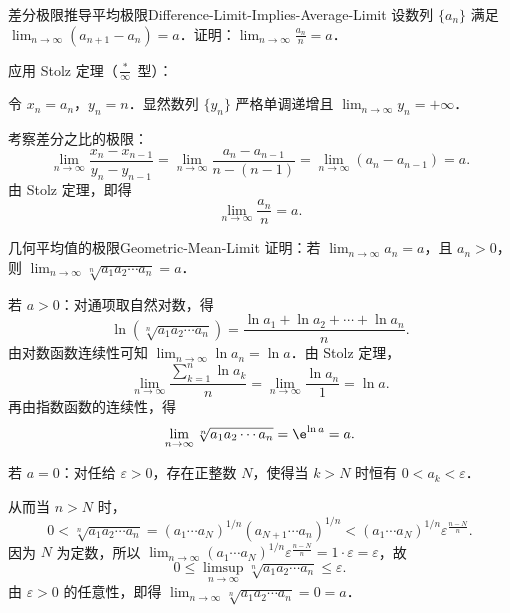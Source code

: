 \begin{problem}{差分极限推导平均极限}{Difference-Limit-Implies-Average-Limit}
    设数列 $\{a_n\}$ 满足 $\lim_{n\to\infty} (a_{n+1} - a_n) = a$．证明：$\lim_{n\to\infty} \frac{a_n}{n} = a$．
\end{problem}

\begin{myproof}
    应用 Stolz 定理（$\frac{*}{\infty}$ 型）：

    令 $x_n = a_n$，$y_n = n$．显然数列 $\{y_n\}$ 严格单调递增且 $\lim_{n\to\infty} y_n = +\infty$．

    考察差分之比的极限：
    \begin{equation}
        \lim_{n\to\infty} \frac{x_n - x_{n-1}}{y_n - y_{n-1}} = \lim_{n\to\infty} \frac{a_n - a_{n-1}}{n - (n-1)} = \lim_{n\to\infty} (a_n - a_{n-1}) = a.
    \end{equation}
    由 Stolz 定理，即得
    \begin{equation}
        \lim_{n\to\infty} \frac{a_n}{n} = a.
    \end{equation}
\end{myproof}

\begin{problem}{几何平均值的极限}{Geometric-Mean-Limit}
    证明：若 $\lim_{n\to\infty} a_n = a$，且 $a_n > 0$，则 $\lim_{n\to\infty} \sqrt[n]{a_1 a_2 \cdots a_n} = a$．
\end{problem}

\begin{myproof}
    若 $a > 0$：对通项取自然对数，得
    \begin{equation}
        \ln \left( \sqrt[n]{a_1 a_2 \cdots a_n} \right) = \frac{\ln a_1 + \ln a_2 + \cdots + \ln a_n}{n}.
    \end{equation}
    由对数函数连续性可知 $\lim_{n\to\infty} \ln a_n = \ln a$．由 Stolz 定理，
    \begin{equation}
        \lim_{n\to\infty} \frac{\sum_{k=1}^n \ln a_k}{n} = \lim_{n\to\infty} \frac{\ln a_n}{1} = \ln a.
    \end{equation}
    再由指数函数的连续性，得
    \begin{equation}
        \lim_{n\to\infty} \sqrt[n]{a_1 a_2 \cdots a_n} = \e^{\ln a} = a.
    \end{equation}

    若 $a = 0$：对任给 $\varepsilon > 0$，存在正整数 $N$，使得当 $k > N$ 时恒有 $0 < a_k < \varepsilon$．

    从而当 $n > N$ 时，
    \begin{equation}
        0 < \sqrt[n]{a_1 a_2 \cdots a_n} = (a_1 \cdots a_N)^{1/n} (a_{N+1} \cdots a_n)^{1/n} < (a_1 \cdots a_N)^{1/n} \varepsilon^{\frac{n-N}{n}}.
    \end{equation}
    因为 $N$ 为定数，所以 $\lim_{n\to\infty} (a_1 \cdots a_N)^{1/n} \varepsilon^{\frac{n-N}{n}} = 1 \cdot \varepsilon = \varepsilon$，故
    \begin{equation}
        0 \leqslant \limsup_{n\to\infty} \sqrt[n]{a_1 a_2 \cdots a_n} \leqslant \varepsilon.
    \end{equation}
    由 $\varepsilon > 0$ 的任意性，即得 $\lim_{n\to\infty} \sqrt[n]{a_1 a_2 \cdots a_n} = 0 = a$．
\end{myproof}

